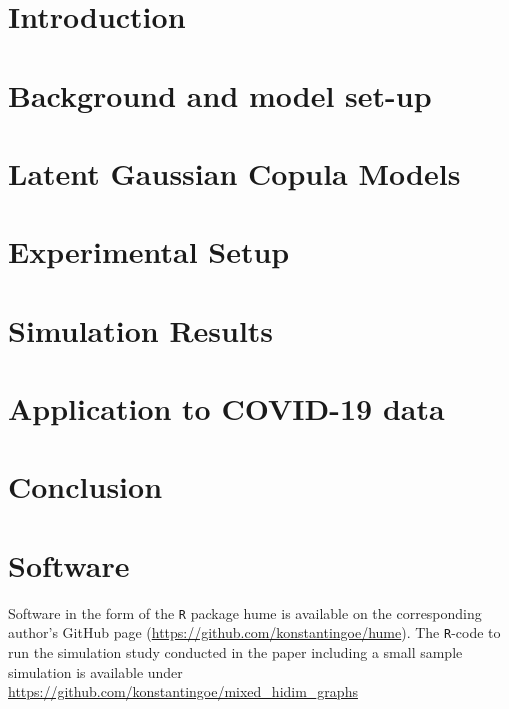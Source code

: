 \documentclass[ejs]{imsart}
\newcommand{\pkg}[1]{{\normalfont\fontseries{b}\selectfont #1}}
\theoremstyle{plain}
\begin{document}


\section{Introduction}
\label{sec::intro}



\section{Background and model set-up}
\label{sec::gaussian}



\section{Latent Gaussian Copula Models}
\label{sec::nonparanormal}



\section{Experimental Setup}\label{sec::setup}



\section{Simulation Results}\label{sec::results}



\section{Application to COVID-19 data}\label{sec::empirical_application}



\section{Conclusion}\label{sec::conclusions}



\section{Software}\label{sec5}

Software in the form of the \texttt{R} package \pkg{hume} is available on the corresponding author's GitHub page (\url{https://github.com/konstantingoe/hume}). The \texttt{R}-code to run the simulation study conducted in the paper including a small sample simulation is available under \url{https://github.com/konstantingoe/mixed_hidim_graphs}
\end{document}
